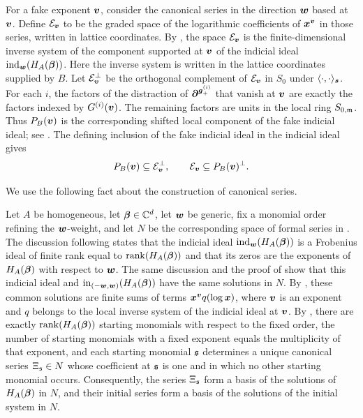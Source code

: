 For a fake exponent \(\boldsymbol{v}\), consider the canonical series in the direction \(\boldsymbol{w}\) based at \(\boldsymbol{v}\).
Define \(\mathcal E_{\boldsymbol{v}}\) to be the graded space of the logarithmic coefficients of \(\boldsymbol{x}^{\boldsymbol{v}}\) in those series, written in lattice coordinates.
By \cite[Theorem~4.9]{OS25}, the space \(\mathcal E_{\boldsymbol{v}}\) is the finite-dimensional inverse system of the component supported at \(\boldsymbol{v}\) of the indicial ideal \(\operatorname{ind}_{\boldsymbol{w}}(H_A(\boldsymbol{\beta}))\).
Here the inverse system is written in the lattice coordinates supplied by \(B\).
Let \(\mathcal E_{\boldsymbol{v}}^{\perp}\) be the orthogonal complement of \(\mathcal E_{\boldsymbol{v}}\) in \(S_0\) under \(\langle\cdot,\cdot\rangle_{\boldsymbol{s}}\).
For each \(i\), the factors of the distraction of \(\boldsymbol{\partial}^{\boldsymbol{g}^{(i)}_+}\) that vanish at \(\boldsymbol{v}\) are exactly the factors indexed by \(G^{(i)}(\boldsymbol{v})\).
The remaining factors are units in the local ring \(S_{0,\mathfrak m}\).
Thus \(P_B(\boldsymbol{v})\) is the corresponding shifted local component of the fake indicial ideal; see \cite[Section~3.2]{SST00}.
The defining inclusion of the fake indicial ideal in the indicial ideal gives
\begin{equation}
	P_B(\boldsymbol{v})
	\subseteq
	\mathcal E_{\boldsymbol{v}}^{\perp},
	\qquad
	\mathcal E_{\boldsymbol{v}}
	\subseteq
	P_B(\boldsymbol{v})^\perp.
	\label{eq:actual-fake-local-inclusions}
\end{equation}

We use the following fact about the construction of canonical series.

\begin{fact}
	\label{fact:canonical-series-construction}
	Let \(A\) be homogeneous, let \(\boldsymbol{\beta}\in\mathbb C^d\), let \(\boldsymbol{w}\) be generic, fix a monomial order refining the \(\boldsymbol{w}\)-weight, and let \(N\) be the corresponding space of formal series in \cite[Section~2.5]{SST00}.
	The discussion following \cite[Algorithm~2.5.8]{SST00} states that the indicial ideal \(\operatorname{ind}_{\boldsymbol{w}}(H_A(\boldsymbol{\beta}))\) is a Frobenius ideal of finite rank equal to \(\operatorname{rank}(H_A(\boldsymbol{\beta}))\) and that its zeros are the exponents of \(H_A(\boldsymbol{\beta})\) with respect to \(\boldsymbol{w}\).
	The same discussion and the proof of \cite[Lemma~2.5.10]{SST00} show that this indicial ideal and \(\operatorname{in}_{(-\boldsymbol{w},\boldsymbol{w})}(H_A(\boldsymbol{\beta}))\) have the same solutions in \(N\).
	By \cite[Theorem~2.3.11]{SST00}, these common solutions are finite sums of terms \(\boldsymbol{x}^{\boldsymbol{v}}q(\log\boldsymbol{x})\), where \(\boldsymbol{v}\) is an exponent and \(q\) belongs to the local inverse system of the indicial ideal at \(\boldsymbol{v}\).
	By \cite[Lemma~2.5.9, Corollary~2.5.11, and Theorem~2.5.12]{SST00}, there are exactly \(\operatorname{rank}(H_A(\boldsymbol{\beta}))\) starting monomials with respect to the fixed order, the number of starting monomials with a fixed exponent equals the multiplicity of that exponent, and each starting monomial \(\mathfrak s\) determines a unique canonical series \(\Xi_{\mathfrak s}\in N\) whose coefficient at \(\mathfrak s\) is one and in which no other starting monomial occurs.
	Consequently, the series \(\Xi_{\mathfrak s}\) form a basis of the solutions of \(H_A(\boldsymbol{\beta})\) in \(N\), and their initial series form a basis of the solutions of the initial system in \(N\).
\end{fact}

